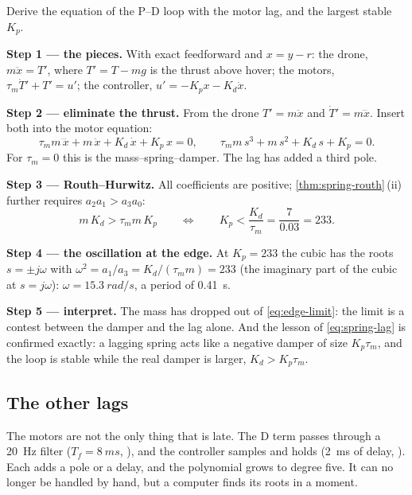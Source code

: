 \begin{example}
\label{ex:edge-cubic}
Derive the equation of the P–D loop with the motor lag, and the largest stable $K_p$.

\textbf{Step 1 — the pieces.} With exact feedforward and $x = y - r$: the drone, $m\ddot x = T'$, where $T' = T - mg$ is the thrust above hover; the motors, $\tau_m\dot T' + T' = u'$; the controller, $u' = -K_p x - K_d\dot x$.

\textbf{Step 2 — eliminate the thrust.} From the drone $T' = m\ddot x$ and $\dot T' = m\dddot x$. Insert both into the motor equation:
\begin{equation}\label{eq:edge-cubic}
  \tau_m m\,\dddot x + m\,\ddot x + K_d\,\dot x + K_p\,x = 0,
  \qquad
  \tau_m m\,s^3 + m\,s^2 + K_d\,s + K_p = 0 .
\end{equation}
For $\tau_m = 0$ this is the mass–spring–damper. The lag has added a third pole.

\textbf{Step 3 — Routh–Hurwitz.} All coefficients are positive; \cref{thm:spring-routh}\,(ii) further requires $a_2a_1 > a_3a_0$:
\begin{equation}\label{eq:edge-limit}
  m\,K_d > \tau_m m\,K_p \qquad\Longleftrightarrow\qquad K_p < \frac{K_d}{\tau_m} = \frac{7}{0.03} = 233 .
\end{equation}

\textbf{Step 4 — the oscillation at the edge.} At $K_p = 233$ the cubic has the roots $s = \pm j\omega$ with $\omega^2 = a_1/a_3 = K_d/(\tau_m m) = 233$ (the imaginary part of the cubic at $s = j\omega$): $\omega = \SI{15.3}{rad/s}$, a period of \SI{0.41}{s}.

\textbf{Step 5 — interpret.} The mass has dropped out of \cref{eq:edge-limit}: the limit is a contest between the damper and the lag alone. And the lesson of \cref{eq:spring-lag} is confirmed exactly: a lagging spring acts like a negative damper of size $K_p\tau_m$, and the loop is stable while the real damper is larger, $K_d > K_p\tau_m$.
\end{example}

\subsection{The other lags}
The motors are not the only thing that is late. The D term passes through a \SI{20}{Hz} filter ($T_f = \SI{8}{ms}$, ), and the controller samples and holds (\SI{2}{ms} of delay, ). Each adds a pole or a delay, and the polynomial grows to degree five. It can no longer be handled by hand, but a computer finds its roots in a moment.

